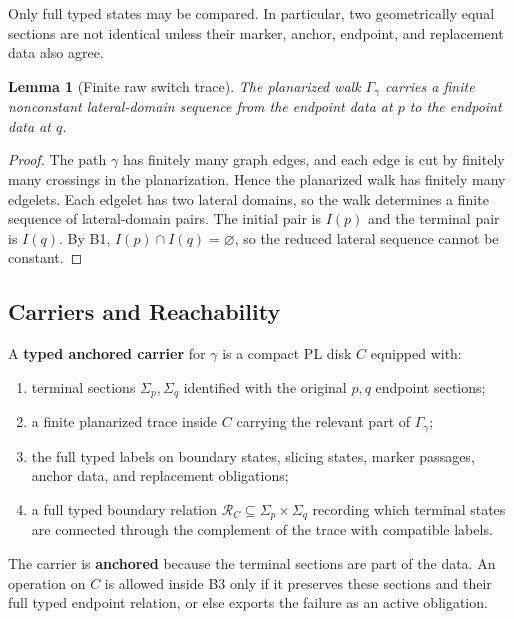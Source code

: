 \documentclass[11pt]{amsart}
\newtheorem{lemma}[theorem]{Lemma}
\theoremstyle{definition}
\begin{document}
Only full typed states may be compared. In particular, two geometrically equal sections are not identical unless their marker, anchor, endpoint, and replacement data also agree.

\begin{lemma}[Finite raw switch trace]
The planarized walk \(\Gamma_\gamma\) carries a finite nonconstant lateral-domain sequence from the endpoint data at \(p\) to the endpoint data at \(q\).

\end{lemma}
\begin{proof}
The path \(\gamma\) has finitely many graph edges, and each edge is cut by finitely many crossings in the planarization. Hence the planarized walk has finitely many edgelets. Each edgelet has two lateral domains, so the walk determines a finite sequence of lateral-domain pairs. The initial pair is \(I(p)\) and the terminal pair is \(I(q)\). By B1, \(I(p)\cap I(q)=\varnothing\), so the reduced lateral sequence cannot be constant.

\end{proof}
\subsection{Carriers and Reachability}

A \textbf{typed anchored carrier} for \(\gamma\) is a compact PL disk \(C\) equipped with:

\begin{enumerate}
\item terminal sections \(\Sigma_p,\Sigma_q\) identified with the original \(p,q\) endpoint sections;
\item a finite planarized trace inside \(C\) carrying the relevant part of \(\Gamma_\gamma\);
\item the full typed labels on boundary states, slicing states, marker passages, anchor data, and replacement obligations;
\item a full typed boundary relation \(\mathcal R_C\subseteq \Sigma_p\times\Sigma_q\) recording which terminal states are connected through the complement of the trace with compatible labels.
\end{enumerate}

The carrier is \textbf{anchored} because the terminal sections are part of the data. An operation on \(C\) is allowed inside B3 only if it preserves these sections and their full typed endpoint relation, or else exports the failure as an active obligation.
\end{document}
